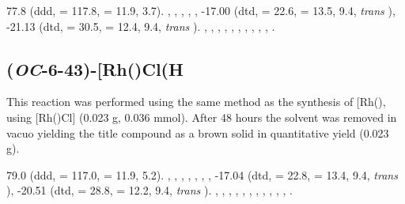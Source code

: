 77.8 (ddd, \JRhP{} = 117.8, \JPH{} = 11.9, 3.7).
,
,
,
,
,
-17.00 (dtd, \JRhH{} = 22.6, \JPH{} = 13.5, \JHH{} 9.4,  \emph{trans} ),
-21.13 (dtd, \JRhH{} = 30.5, \JPH{} = 12.4, \JHH{} 9.4,  \emph{trans} ).
,
,
,
,
,
,
,
,
,
,
.

 
\subsection*{(\emph{OC}-6-43)-\texorpdfstring{[Rh(\tBuxantphosk)Cl(H\ce{)2]}} R}


This reaction was performed using the same method as the synthesis of [Rh(\tBusixantphos)\ce{Cl(H)2]}, using [Rh(\tBuxantphos)Cl] (0.023 g, 0.036 mmol).  After 48 hours the solvent was removed in vacuo yielding the title compound as a brown solid in quantitative yield (0.023 g).

79.0 (ddd, \JRhP{} = 117.0, \JPH{} = 11.9, 5.2).
,
,
,
,
,
,
,
-17.04 (dtd, \JRhH{} = 22.8, \JPH{} = 13.4, \JHH{} 9.4,  \emph{trans} ),
-20.51 (dtd, \JRhH{} = 28.8, \JPH{} = 12.2, \JHH{} 9.4,  \emph{trans} ).
,
,
,
,
,
,
,
,
,
,
,
.


